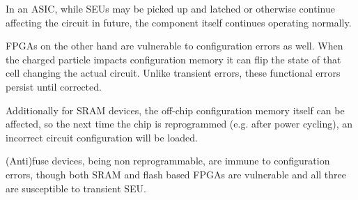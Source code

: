 \documentclass[12pt,final,oneside]{dwThesis} %
\begin{document}
In an \ac{ASIC}, while \acp{SEU} may be picked up and latched or otherwise continue affecting the circuit in future, the component itself continues operating normally.

\acp{FPGA} on the other hand are vulnerable to configuration errors as well. When the charged particle impacts configuration memory it can flip the state of that cell changing the actual circuit. Unlike transient errors, these functional errors persist until corrected.

Additionally for \ac{SRAM} devices, the off-chip configuration memory itself can be affected, so the next time the chip is reprogrammed (e.g. after power cycling), an incorrect circuit configuration will be loaded.

(Anti)fuse devices, being non reprogrammable, are immune to configuration errors, though both \ac{SRAM} and flash based \acp{FPGA} are vulnerable and all three are susceptible to transient \ac{SEU}\cite{HFPP}.
\end{document}
